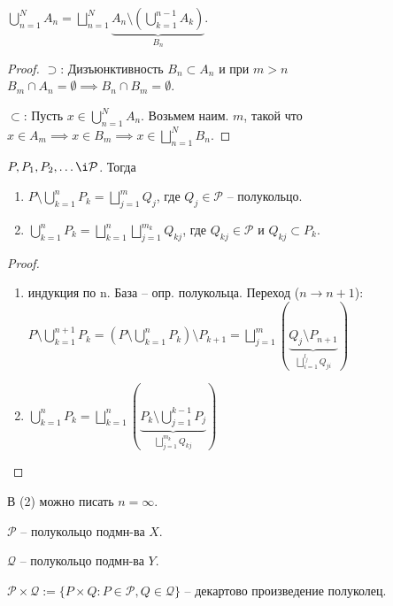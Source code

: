 \begin{lemma}
    $\bigcup_{n=1}^{N} A_n = \bigsqcup_{n=1}^{N}\underbrace{A_n \setminus \left(\bigcup_{k=1}^{n-1}A_k\right)}_{B_n}$.
\end{lemma}
\begin{proof}
    $\supset$: Дизъюнктивность $B_n \subset A_n $ и при $m > n$ $B_m \cap A_n = \emptyset \implies B_n \cap B_m = \emptyset$.
    
    $\subset$: Пусть $x \in \bigcup_{n=1}^{N} A_n$. Возьмем наим. $m$, такой что $x \in A_m \implies x \in B_m \implies x \in \bigsqcup_{n=1}^{N} B_n$.
\end{proof}

\begin{theorem}
    $P, P_1, P_2, \dots \i \mathcal{P}$. Тогда 

    \begin{enumerate}
        \item $P \setminus \bigcup_{k=1}^{n} P_k = \bigsqcup_{j=1}^m Q_j$, где $Q_j \in \mathcal{P}$ -- полукольцо.
        \item $\bigcup_{k=1}^{n} P_k = \bigsqcup_{k=1}^{n} \bigsqcup_{j=1}^{m_k} Q_{kj}$, где $Q_{kj} \in \mathcal{P}$ и $Q_{kj} \subset P_k$. 
    \end{enumerate}
\end{theorem}

\begin{proof}
    \begin{enumerate}
        \item индукция по n. База -- опр. полукольца. Переход ($n \rightarrow n+1$): \\ $P \setminus \bigcup_{k=1}^{n+1}P_k = \left(P \setminus \bigcup_{k=1}^nP_k\right) \setminus P_{k+1} = \bigsqcup_{j=1}^{m} \left(\underbrace{Q_j \setminus P_{n+1}}_{\bigsqcup_{i=1}^{l_j}Q_{ji}}\right)$
        \item $\bigcup_{k=1}^{n} P_k = \bigsqcup_{k=1}^{n} \left(\underbrace{P_k \setminus \bigcup_{j=1}^{k-1} P_j}_{\bigsqcup_{j=1}^{m_k} Q_{kj}}\right)$
    \end{enumerate}
\end{proof}

\begin{remark}
    В (2) можно писать $n = \infty$.
\end{remark}

\begin{definition}
    $\mathcal{P}$ -- полукольцо подмн-ва $X$.

    $\mathcal{Q}$ -- полукольцо подмн-ва $Y$.

    $\mathcal{P} \times \mathcal{Q} := \{P \times Q : P \in \mathcal{P}, Q \in \mathcal{Q}\}$ -- декартово произведение полуколец.
\end{definition}

